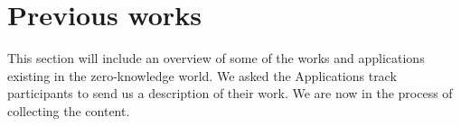 \section{Previous works}
\label{apps:previous-works}

This section will include an overview of some of the works and applications existing in the zero-knowledge world. 
We asked the Applications track participants to send us a description of their work.
We are now in the process of collecting the content.
